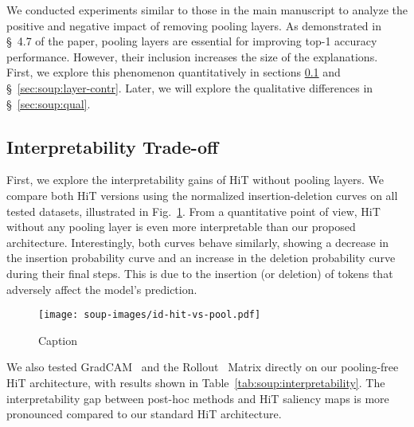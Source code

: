 We conducted experiments similar to those in the main manuscript to analyze the positive and negative impact of removing pooling layers. As demonstrated in \S~4.7 of the paper, pooling layers are essential for improving top-1 accuracy performance. However, their inclusion increases the size of the explanations. First, we explore this phenomenon quantitatively in sections \ref{sec:soup:tradeoff} and \S~\ref{sec:soup:layer-contr}. Later, we will explore the qualitative differences in \S~\ref{sec:soup:qual}.


\subsection{Interpretability Trade-off} \label{sec:soup:tradeoff}

First, we explore the interpretability gains of HiT without pooling layers. We compare both HiT versions using the normalized insertion-deletion curves on all tested datasets, illustrated in Fig.~\ref{fig:soup:id-pool}. From a quantitative point of view, HiT without any pooling layer is even more interpretable than our proposed architecture. Interestingly, both curves behave similarly, showing a decrease in the insertion probability curve and an increase in the deletion probability curve during their final steps. This is due to the insertion (or deletion) of tokens that adversely affect the model's prediction. 

\begin{figure}[h]
    \centering
    \texttt{[image: soup-images/id-hit-vs-pool.pdf]}
    \caption{Caption}
    \label{fig:soup:id-pool}
\end{figure}

We also tested GradCAM~\cite{8237336} and the Rollout~\cite{abnar2020quantifying} Matrix directly on our pooling-free HiT architecture, with results shown in Table~\ref{tab:soup:interpretability}. The interpretability gap between post-hoc methods and HiT saliency maps is more pronounced compared to our standard HiT architecture.


